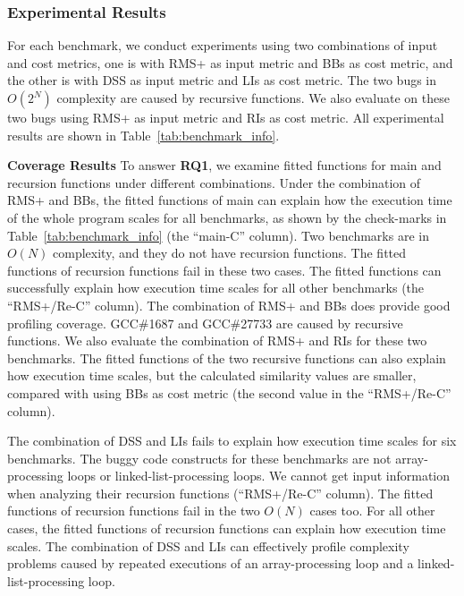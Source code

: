 \subsubsection{Experimental Results} 
For each benchmark, we conduct experiments using two 
combinations of input and cost metrics, one is with 
RMS+ as input metric and BBs as cost metric, 
and the other is with DSS as input metric and LIs as cost metric. 
The two bugs in $O(2^N)$ complexity are caused by recursive functions.
We also evaluate \Tool on these two bugs 
using RMS+ as input metric and RIs as cost metric. 
All experimental results are shown in Table~\ref{tab:benchmark_info}.


\textbf{Coverage Results}
To answer {\bf RQ1}, 
we examine fitted functions for main and recursion functions 
under different combinations. 
Under the combination of RMS+ and BBs, 
the fitted functions of main can explain 
how the execution time of the whole program scales for all benchmarks, 
as shown by the check-marks 
in Table~\ref{tab:benchmark_info} (the ``main-C'' column).
Two benchmarks are in $O(N)$ complexity, and they do not have recursion functions.
The fitted functions of recursion functions fail in these two cases. 
The fitted functions can successfully 
explain how execution time scales for all other benchmarks (the ``RMS+/Re-C'' column).
The combination of RMS+ and BBs does provide good profiling coverage. 
GCC\#1687 and GCC\#27733 are caused by recursive functions. 
We also evaluate the combination of RMS+ and RIs for these two benchmarks.
The fitted functions of the two recursive functions can also explain how execution time scales, 
but the calculated similarity values are smaller, 
compared with using BBs as cost metric 
(the second value in the ``RMS+/Re-C'' column). 

The combination of DSS and LIs fails to explain how execution time scales for six benchmarks.
The buggy code constructs for these benchmarks 
are not array-processing loops or linked-list-processing loops. 
We cannot get input information 
when analyzing their recursion functions 
(``RMS+/Re-C'' column).  
The fitted functions of recursion functions fail in the two $O(N)$ cases too.
For all other cases, the fitted functions of recursion functions can 
explain how execution time scales. 
The combination of DSS and LIs can effectively 
profile complexity problems caused by 
repeated executions of an array-processing loop 
and a linked-list-processing loop. 


